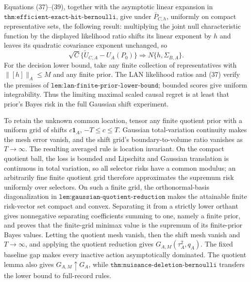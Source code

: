Equations (37)--(39), together with the asymptotic linear expansion in \(\texttt{thm:efficient-exact-hit-bernoulli}\), give under \(\bar P_{C,h}\), uniformly on compact representative sets, the following result: multiplying the joint null characteristic function by the displayed likelihood ratio shifts its linear exponent by \(h\) and leaves its quadratic covariance exponent unchanged, so
\[
 \sqrt C\{\widetilde U_{C,A}-U_A(P_0)\}\Rightarrow
 N\{h,\Sigma_{B,A}\}. \tag{40}
\]
For the decision lower bound, take any finite collection of representatives with \(\lVert[h]\rVert_A\leq M\) and any finite prior.  The LAN likelihood ratios and (37) verify the premises of \(\texttt{lem:lan-finite-prior-lower-bound}\); bounded scores give uniform integrability.  Thus the limiting maximal scaled causal regret is at least that prior's Bayes risk in the full Gaussian shift experiment.

To retain the unknown common location, tensor any finite quotient prior with a uniform grid of shifts \(c\mathbf1_A\), \(-T\leq c\leq T\).  Gaussian total-variation continuity makes the mesh error vanish, and the shift grid's boundary-to-volume ratio vanishes as \(T\to\infty\).  The resulting averaged rule is location invariant.  On the compact quotient ball, the loss is bounded and Lipschitz and Gaussian translation is continuous in total variation, so all selector risks have a common modulus; an arbitrarily fine finite quotient grid therefore approximates the supremum risk uniformly over selectors.  On such a finite grid, the orthonormal-basis diagonalization in \(\texttt{lem:gaussian-quotient-reduction}\) makes the attainable finite risk-vector set compact and convex.  Separating it from a strictly lower orthant gives nonnegative separating coefficients summing to one, namely a finite prior, and proves that the finite-grid minimax value is the supremum of its finite-prior Bayes values.  Letting the quotient mesh vanish, then the shift mesh vanish and \(T\to\infty\), and applying the quotient reduction gives \(G_{A,M}(\tau_A^2,q_A)\).  The fixed baseline gap makes every inactive action asymptotically dominated.  The quotient lemma also gives \(G_{A,M}\uparrow G_A\), while \(\texttt{thm:nuisance-deletion-bernoulli}\) transfers the lower bound to full-record rules.